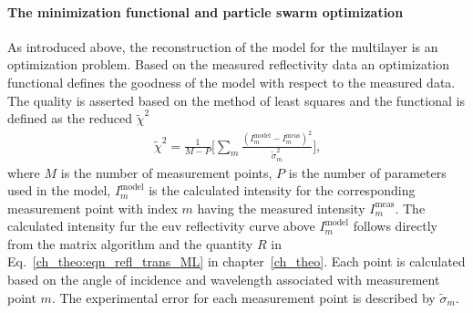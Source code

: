 \paragraph{The minimization functional and particle swarm optimization}
As introduced above, the reconstruction of the model for the multilayer is an optimization problem. Based on the measured reflectivity data an optimization functional defines the goodness of the model with respect to the measured data. The quality is asserted based on the method of least squares \cite{legendre_nouvelles_1805, gauss_theoria_1809, birge_calculation_1932} and the functional is defined as the reduced $\tilde{\chi}^2$
\begin{align}
\tilde{\chi}^2 = \frac{1}{M-P} \bigg[\sum\limits_{m} \frac{(I_m^\text{model} 
- I_m^\text{meas})^2}{\tilde{\sigma}_m^2} \bigg] \text{,} 
\label{ch_spec:eqn_reduced_chi_squared}
\end{align}
where $M$ is the number of measurement points, $P$ is the number of parameters used in the model, $I_m^\text{model}$ is the calculated intensity for the corresponding measurement point with index $m$ having the measured intensity $I_m^\text{meas}$. The calculated intensity fur the \gls{euv} reflectivity curve above $I_m^\text{model}$ follows directly from the matrix algorithm and the quantity $R$ in Eq.~\eqref{ch_theo:eqn_refl_trans_ML} in chapter~\ref{ch_theo}. Each point is calculated based on the angle of incidence and wavelength associated with measurement point $m$. The experimental error for each measurement point is described by $\tilde{\sigma}_m$.

